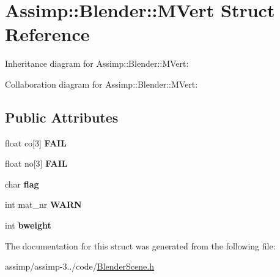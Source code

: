 \hypertarget{struct_assimp_1_1_blender_1_1_m_vert}{\section{Assimp\+:\+:Blender\+:\+:M\+Vert Struct Reference}
\label{struct_assimp_1_1_blender_1_1_m_vert}
}


Inheritance diagram for Assimp\+:\+:Blender\+:\+:M\+Vert\+:


Collaboration diagram for Assimp\+:\+:Blender\+:\+:M\+Vert\+:
\subsection*{Public Attributes}
\begin{DoxyCompactItemize}
\item 
\hypertarget{struct_assimp_1_1_blender_1_1_m_vert_a6580d5f3a20a730a558504b8e8113651}{float co\mbox{[}3\mbox{]} {\bfseries F\+A\+I\+L}}\label{struct_assimp_1_1_blender_1_1_m_vert_a6580d5f3a20a730a558504b8e8113651}

\item 
\hypertarget{struct_assimp_1_1_blender_1_1_m_vert_afb3ebf27094b9ca029f2178caea88974}{float no\mbox{[}3\mbox{]} {\bfseries F\+A\+I\+L}}\label{struct_assimp_1_1_blender_1_1_m_vert_afb3ebf27094b9ca029f2178caea88974}

\item 
\hypertarget{struct_assimp_1_1_blender_1_1_m_vert_a7773046efa9794eac00159c3a7303119}{char {\bfseries flag}}\label{struct_assimp_1_1_blender_1_1_m_vert_a7773046efa9794eac00159c3a7303119}

\item 
\hypertarget{struct_assimp_1_1_blender_1_1_m_vert_ab9ac730dddccda3487c841c5b84578ef}{int mat\+\_\+nr {\bfseries W\+A\+R\+N}}\label{struct_assimp_1_1_blender_1_1_m_vert_ab9ac730dddccda3487c841c5b84578ef}

\item 
\hypertarget{struct_assimp_1_1_blender_1_1_m_vert_a6cec07ecbb284106d825c1bf13553fb6}{int {\bfseries bweight}}\label{struct_assimp_1_1_blender_1_1_m_vert_a6cec07ecbb284106d825c1bf13553fb6}

\end{DoxyCompactItemize}


The documentation for this struct was generated from the following file\+:\begin{DoxyCompactItemize}
\item 
assimp/assimp-\/3../code/\hyperlink{_blender_scene_8h}{Blender\+Scene.\+h}\end{DoxyCompactItemize}
